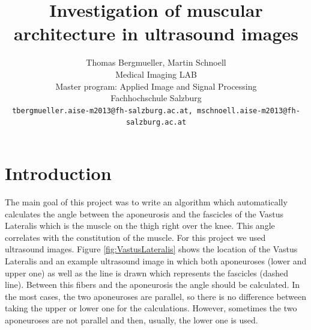 \documentclass[10pt,twocolumn,letterpaper]{article}
\begin{document}
\title{Investigation of muscular architecture in ultrasound images}

\author{Thomas Bergmueller, Martin Schnoell\\
Medical Imaging LAB\\
Master program: Applied Image and Signal Processing\\
Fachhochschule Salzburg\\
{\tt\small tbergmueller.aise-m2013@fh-salzburg.ac.at, mschnoell.aise-m2013@fh-salzburg.ac.at}
}

\maketitle
\thispagestyle{empty}



\section{Introduction}
The main goal of this project was to write an algorithm which automatically calculates the angle between the aponeurosis and the fascicles of the Vastus Lateralis which is the muscle on the thigh right over the knee. This angle correlates with the constitution of the muscle.
For this project we used ultrasound images.  
Figure \ref{fig:VastusLateralis} shows the location of the Vastus Lateralis and an example ultrasound image in which both aponeuroses (lower and upper one) as well as the line is drawn which represents the fascicles (dashed line). Between this fibers and the aponeurosis the angle should be calculated. In the most cases, the two aponeuroses are parallel, so there is no difference between taking the upper or lower one for the calculations. However, sometimes the two aponeuroses are not parallel and then, usually, the lower one is used. 
\end{document}
